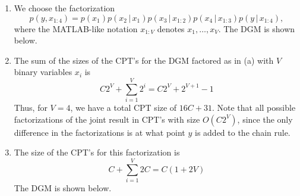 \documentclass[submit]{harvardml}
\newcommand{\given}{\,|\,}
\begin{document}

\begin{enumerate}[label=(\alph*)]
	\item We choose the factorization
	\[
	p(y, x_{1:4}) = 
	p(x_1) 
	p(x_2\given x_1) 
	p(x_3\given x_{1:2}) 
	p(x_4\given x_{1:3}) 
	p(y\given x_{1:4}),
	\]
	where the MATLAB-like notation $x_{1:V}$ denotes $x_1,\dots,x_V$. The DGM is shown below.
	\begin{center}
	\end{center}

	\item The sum of the sizes of the CPT's for the DGM factored as in (a) with $V$ binary variables $x_i$ is
	\[
	C2^V + \sum_{i=1}^V 2^i = C2^V + 2^{V+1} - 1
	\]
	Thus, for $V=4$, we have a total CPT size of $16C + 31$. Note that all possible factorizations of the joint result in CPT's with size $O(C2^V)$, since the only difference in the factorizations is at what point $y$ is added to the chain rule. 
	
	\item The size of the CPT's for this factorization is
	\[
	C + \sum_{i=1}^V 2C = C(1 + 2V)
	\]
	The DGM is shown below.
	\begin{center}
	\end{center}
	

\end{enumerate}
\end{document}
